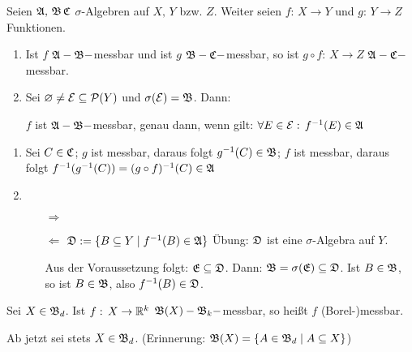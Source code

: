 \documentclass[a4paper,twoside,DIV15,BCOR12mm,chapterprefix=true,headings=onelinechapter]{scrbook}
\begin{document}
\begin{satz}
\label{Satz 3.1}
Seien \(\mathfrak{A},\,\mathfrak{B}\,\mathfrak{C}\) \(\sigma\)-Algebren auf \(X,\,Y\) bzw. \(Z\). Weiter seien \(f:\,X\to Y\) und \(g:\,Y\to Z\)
Funktionen.
\begin{enumerate}
\item Ist \(f\) \(\mathfrak{A}-\mathfrak{B}-\)messbar und ist \(g\) \(\mathfrak{B}-\mathfrak{C}-\)messbar, so ist \(g\circ f:\,X\to Z\) \(\mathfrak{A}-\mathfrak{C}-\)messbar.
\item Sei \(\varnothing\neq\mathcal{E}\subseteq\mathcal{P}(Y)\) und \(\sigma(\mathcal{E})=\mathfrak{B}\). Dann:
\begin{center}
\(f\) ist \(\mathfrak{A}-\mathfrak{B}-\)messbar, genau dann, wenn gilt: \(\forall E\in\mathcal{E}:\,f^{-1}(E)\in\mathfrak{A}\)
\end{center}
\end{enumerate}
\end{satz}

\begin{beweis}
\begin{enumerate}
\item Sei \(C\in\mathfrak{C}\); \(g\) ist messbar, daraus folgt \(g^{-1}(C)\in\mathfrak{B}\);
\(f\) ist messbar, daraus folgt \(f^{-1}(g^{-1}(C))=(g\circ f)^{-1}(C)\in\mathfrak{A}\)
\item \begin{itemize}
\item[\(\Rightarrow\)] \checkmark
\item[\(\Leftarrow\)] \(\mathfrak{D}:=\{B\subseteq Y\mid f^{-1}(B)\in\mathfrak{A}\}\)
\"Ubung: \(\mathfrak{D}\) ist eine \(\sigma\)-Algebra auf \(Y\).

Aus der Voraussetzung folgt: \(\mathfrak{E}\subseteq\mathfrak{D}\).
Dann: \(\mathfrak{B}=\sigma(\mathfrak{E})\subseteq\mathfrak{D}\). Ist \(B\in\mathfrak{B}\), so ist \(B\in\mathfrak{B}\), also
\(f^{-1}(B)\in\mathfrak{D}\).
\end{itemize}
\end{enumerate}
\end{beweis}

\begin{definition}
Sei \(X\in\mathfrak{B}_{d}\). Ist \(f:\,X\to\mathbb{R}^{k}\) \(\mathfrak{B}(X)-\mathfrak{B}_{k}-\)messbar, so hei\ss t \(f\) (Borel-)messbar.
\end{definition}
Ab jetzt sei stets \(X\in\mathfrak{B}_{d}\). (Erinnerung: \(\mathfrak{B}(X)=\{A\in\mathfrak{B}_{d}\mid A\subseteq X\}\))
\end{document}
